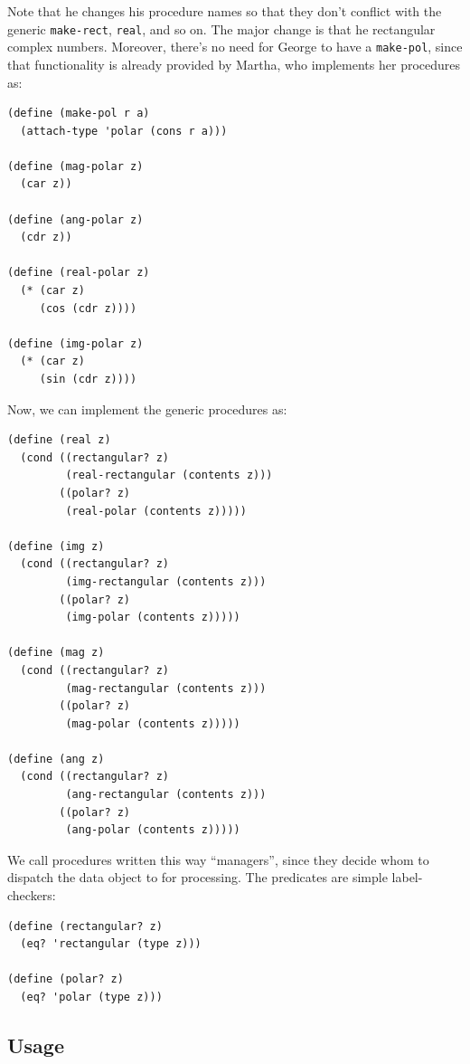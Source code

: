 \documentclass[9pt]{report}
\begin{document}
Note that he changes his procedure names so that they don't
conflict with the generic \texttt{make-rect}, \texttt{real}, and so on. The
major change is that he rectangular complex numbers. Moreover,
there's no need for George to have a \texttt{make-pol}, since that
functionality is already provided by Martha, who implements her
procedures as:

\begin{verbatim}
(define (make-pol r a)
  (attach-type 'polar (cons r a)))

(define (mag-polar z)
  (car z))

(define (ang-polar z)
  (cdr z))

(define (real-polar z)
  (* (car z)
     (cos (cdr z))))

(define (img-polar z)
  (* (car z)
     (sin (cdr z))))
\end{verbatim}

Now, we can implement the generic procedures as:

\begin{verbatim}
(define (real z)
  (cond ((rectangular? z)
         (real-rectangular (contents z)))
        ((polar? z)
         (real-polar (contents z)))))

(define (img z)
  (cond ((rectangular? z)
         (img-rectangular (contents z)))
        ((polar? z)
         (img-polar (contents z)))))

(define (mag z)
  (cond ((rectangular? z)
         (mag-rectangular (contents z)))
        ((polar? z)
         (mag-polar (contents z)))))

(define (ang z)
  (cond ((rectangular? z)
         (ang-rectangular (contents z)))
        ((polar? z)
         (ang-polar (contents z)))))
\end{verbatim}

We call procedures written this way ``managers'', since they decide
whom to dispatch the data object to for processing. The predicates
are simple label-checkers:

\begin{verbatim}
(define (rectangular? z)
  (eq? 'rectangular (type z)))

(define (polar? z)
  (eq? 'polar (type z)))
\end{verbatim}

\subsection{Usage}
\label{sec:orgf123172}
\end{document}
